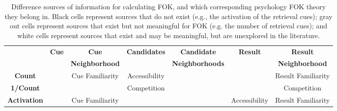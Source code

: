 \documentclass[10pt,letterpaper]{article}
\newcommand{\fixme}[2][]{#2}
\renewcommand{\fixme}[2][]{\textcolor{red}{#2}}
\newcommand{\tableheader}[1]{\multirow{2}{*}{\textbf{#1}}}
\newcommand{\whitecell}[0]{}
\newcommand{\graycell}[0]{\cellcolor{gray!70}}
\newcommand{\blackcell}[0]{\cellcolor{black}}
\begin{document}
\begin{table*}[ht]
\begin{tabular}{c|cccccc}
\whitecell           &  \tableheader{Cue}   &  \textbf{Cue}           &  \tableheader{Candidates}  &  \textbf{Candidate}      &  \tableheader{Result}  &  \textbf{Result}        \\  
\whitecell           &  \whitecell          &  \textbf{Neighborhood}  &  \whitecell                &  \textbf{Neighborhoods}  &  \whitecell            &  \textbf{Neighborhood}  \\  
\hline                                                                                                                                                                               
\textbf{Count}       &  \graycell           &  Cue Familiarity        &  Accessibility             &  \whitecell              &  \graycell             &  Result Familiarity     \\  
\textbf{1/Count}     &  \graycell           &  \whitecell             &  Competition               &  \whitecell              &  \graycell             &  Competition            \\  
\textbf{Activation}  &  \blackcell          &  Cue Familiarity        &  \whitecell                &  \whitecell              &  Accessibility         &  Result Familiarity     \\  
\end{tabular}


\caption{
    Difference sources of information for calculating FOK, and which corresponding psychology FOK theory they belong in.
    Black cells represent sources that do not exist (e.g., the activation of the retrieval cues);
    gray out cells represent sources that exist but not meaningful for FOK (e.g. the number of retrieval cues);
    and white cells represent sources that exist and may be meaningful, but are unexplored in the literature.
    \fixme[Need to explain ``neighborhood'']{}
}
\label{sources}
\end{table*}
\end{document}
